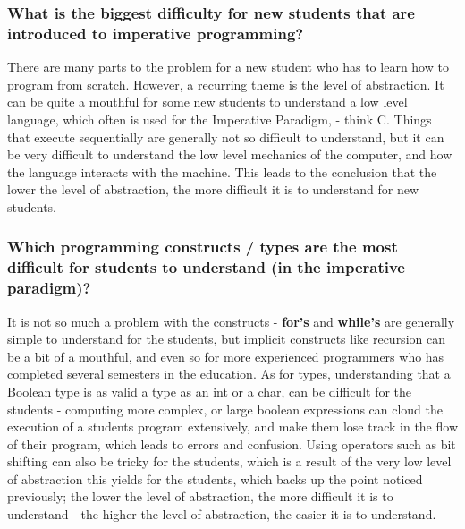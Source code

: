 \subsubsection{What is the biggest difficulty for new students that are introduced to imperative programming?}

There are many parts to the problem for a new student who has to learn how to program from scratch. However, a recurring theme is the level of abstraction. It can be quite a mouthful for some new students to understand a low level language, which often is used for the Imperative Paradigm, - think C. Things that execute sequentially are generally not so difficult to understand, but it can be very difficult to understand the low level mechanics of the computer, and how the language interacts with the machine. This leads to the conclusion that the lower the level of abstraction, the more difficult it is to understand for new students.

\subsubsection{Which programming constructs / types are the most difficult for students to understand (in the imperative paradigm)?}

It is not so much a problem with the constructs - \textbf{for's} and \textbf{while's} are generally simple to understand for the students, but implicit constructs like recursion can be a bit of a mouthful, and even so for more experienced programmers who has completed several semesters in the education. As for types, understanding that a Boolean type is as valid a type as an int or a char, can be difficult for the students - computing more complex, or large boolean expressions can cloud the execution of a students program extensively, and make them lose track in the flow of their program, which leads to errors and confusion. Using operators such as bit shifting can also be tricky for the students, which is a result of the very low level of abstraction this yields for the students, which backs up the point noticed previously; the lower the level of abstraction, the more difficult it is to understand - the higher the level of abstraction, the easier it is to understand.
